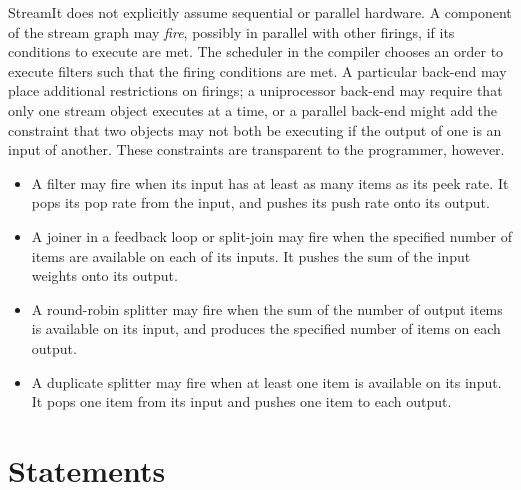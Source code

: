 \documentclass[11pt]{article}
\begin{document}
StreamIt does not explicitly assume sequential or parallel hardware.
A component of the stream graph may \emph{fire}, possibly in parallel
with other firings, if its conditions to execute are met.  The
scheduler in the compiler chooses an order to execute filters such
that the firing conditions are met.  A particular back-end may place
additional restrictions on firings; a uniprocessor back-end may
require that only one stream object executes at a time, or a parallel
back-end might add the constraint that two objects may not both be
executing if the output of one is an input of another.  These
constraints are transparent to the programmer, however.

\begin{itemize}
\item A filter may fire when its input has at least as many items as
  its peek rate.
  It pops its pop rate from the input, and pushes its push rate onto
  its output.
\item A joiner in a feedback loop or split-join may fire when the
  specified number of items are available on each of its inputs.  It
  pushes the sum of the input weights onto its output.
\item A round-robin splitter may fire when the sum of the number of
  output items is available on its input, and produces the specified
  number of items on each output.
\item A duplicate splitter may fire when at least one item is
  available on its input.  It pops one item from its input and pushes
  one item to each output.
\end{itemize}

\section{Statements}
\end{document}
